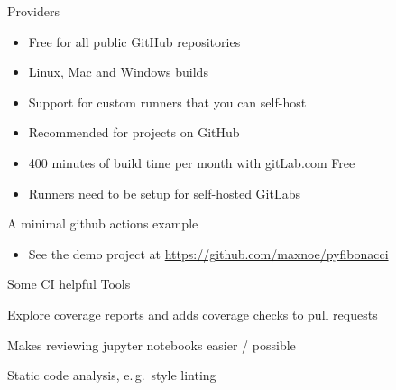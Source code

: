 \begin{frame}[c]{Providers}
  \begin{description}
    \item[GitHub Actions]
      \begin{itemize}
        \item Free for all public GitHub repositories
        \item Linux, Mac and Windows builds
        \item Support for custom runners that you can self-host
        \item Recommended for projects on GitHub
      \end{itemize}
    \item[GitLab CI]
      \begin{itemize}
        \item 400 minutes of build time per month with gitLab.com Free
        \item Runners need to be setup for self-hosted GitLabs
      \end{itemize}
  \end{description}
\end{frame}

\begin{frame}[c]{A minimal github actions example}
  \begin{itemize}
    \item See the demo project at \url{https://github.com/maxnoe/pyfibonacci}
  \end{itemize}
\end{frame}


\begin{frame}[c]{Some CI helpful Tools}
  \begin{description}
    \item[\url{https://codecov.io/}] Explore coverage reports and adds coverage checks to pull requests
    \item[\url{https://reviewnb.com/}] Makes reviewing jupyter notebooks easier / possible
    \item[\url{https://codacy.com/}] Static code analysis, e.\,g.\ style linting
  \end{description}
\end{frame}

